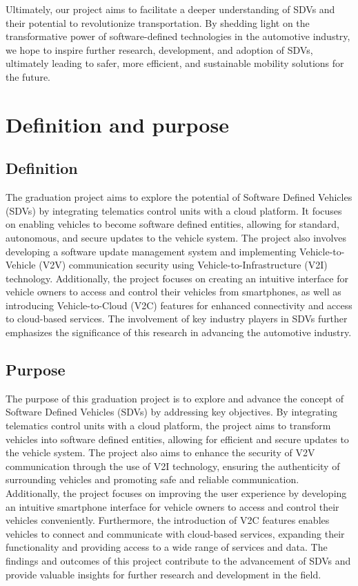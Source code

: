 \documentclass[
12pt,
oneside, 
onehalfspacing, 
nolistspacing, 
parskip, 
chapterinoneline, 
]{AASTCOMPUTER}
\begin{document}
Ultimately, our project aims to facilitate a deeper understanding of SDVs and their potential to revolutionize transportation. By shedding light on the transformative power of software-defined technologies in the automotive industry, we hope to inspire further research, development, and adoption of SDVs, ultimately leading to safer, more efficient, and sustainable mobility solutions for the future.
\section{Definition and purpose}
\subsection{Definition}
The graduation project aims to explore the potential of Software Defined Vehicles (SDVs) by integrating telematics control units with a cloud platform. It focuses on enabling vehicles to become software defined entities, allowing for standard, autonomous, and secure updates to the vehicle system. The project also involves developing a software update management system and implementing Vehicle-to-Vehicle (V2V) communication security using Vehicle-to-Infrastructure (V2I) technology. Additionally, the project focuses on creating an intuitive interface for vehicle owners to access and control their vehicles from smartphones, as well as introducing Vehicle-to-Cloud (V2C) features for enhanced connectivity and access to cloud-based services. The involvement of key industry players in SDVs further emphasizes the significance of this research in advancing the automotive industry.
\subsection{Purpose}
The purpose of this graduation project is to explore and advance the concept of Software Defined Vehicles (SDVs) by addressing key objectives. By integrating telematics control units with a cloud platform, the project aims to transform vehicles into software defined entities, allowing for efficient and secure updates to the vehicle system. The project also aims to enhance the security of V2V communication through the use of V2I technology, ensuring the authenticity of surrounding vehicles and promoting safe and reliable communication. Additionally, the project focuses on improving the user experience by developing an intuitive smartphone interface for vehicle owners to access and control their vehicles conveniently. Furthermore, the introduction of V2C features enables vehicles to connect and communicate with cloud-based services, expanding their functionality and providing access to a wide range of services and data. The findings and outcomes of this project contribute to the advancement of SDVs and provide valuable insights for further research and development in the field.
\end{document}

